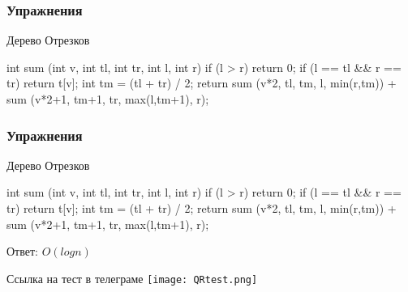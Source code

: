
\begin{frame}[fragile]
    \frametitle{Упражнения}
    
    Дерево Отрезков
    \begin{cpp}
        int sum (int v, int tl, int tr, int l, int r) {
            if (l > r){
                return 0;
            }
            if (l == tl && r == tr){
                return t[v];
            }
            int tm = (tl + tr) / 2;
            return sum (v*2, tl, tm, l, min(r,tm))
            + sum (v*2+1, tm+1, tr, max(l,tm+1), r);
        }
    \end{cpp}
    
\end{frame}


\begin{frame}[fragile]
    \frametitle{Упражнения}

    Дерево Отрезков
    \begin{cpp}
        int sum (int v, int tl, int tr, int l, int r) {
            if (l > r){
                return 0;
            }
            if (l == tl && r == tr){
                return t[v];
            }
            int tm = (tl + tr) / 2;
            return sum (v*2, tl, tm, l, min(r,tm))
            + sum (v*2+1, tm+1, tr, max(l,tm+1), r);
        }
    \end{cpp}
    
    Ответ: $O(log{n})$
\end{frame}


\begin{frame}
    \center\huge{Ссылка на тест в телеграме}
    \center\texttt{[image: QRtest.png]}
\end{frame}


